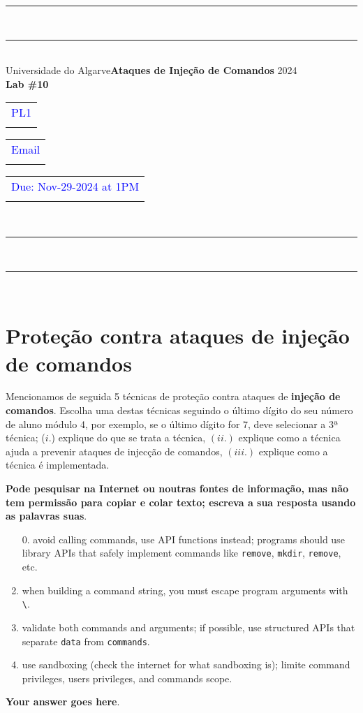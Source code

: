 \documentclass{article}
\begin{document}
\begin{center}
\rule{\textwidth}{.0075in} \\
\rule[3mm]{\textwidth}{.0075in}\\

Universidade do Algarve\hfill \textbf{Ataques de Injeção de Comandos} \hfill 2024\\[3ex]

{\Large\bf Lab \#10} \\[3ex]

\begin{tabular}{l}
\textcolor{blue}{PL1} \\ \hfill 
\end{tabular}
\begin{tabular}{l}
\textcolor{blue}{Email} \\ \hfill 
\end{tabular}
\begin{tabular}{l}
\textcolor{blue}{Due: Nov-29-2024 at 1PM} \\ \hfill 
\end{tabular}\\

\rule{\textwidth}{.0075in} \\
\rule[3mm]{\textwidth}{.0075in} \\
\end{center}

\section*{Proteção contra ataques de injeção de comandos}

Mencionamos de seguida 5 técnicas de proteção contra ataques de
\textbf{injeção de comandos}. Escolha uma destas técnicas seguindo o
último dígito do seu número de aluno módulo 4, por exemplo, se o
último dígito for 7, deve selecionar a 3ª técnica; ($i.$) explique do
que se trata a técnica, $(ii.)$ explique como a técnica ajuda a
prevenir ataques de injecção de comandos, $(iii.)$ explique como a
técnica é implementada.

\bigskip

{\large
  \noindent
\textbf{Pode pesquisar na Internet ou noutras fontes de informação, mas não
tem permissão para copiar e colar texto; escreva a sua resposta usando
as palavras suas}.
}

\bigskip

\begin{enumerate}
\item[0.] avoid calling commands, use API functions instead; programs
  should use library APIs that safely implement commands like
  \texttt{remove}, \texttt{mkdir}, \texttt{remove}, etc.
\item when building a command string, you must escape program
  arguments with \verb|\|.
\item validate both commands and arguments; if possible, use
  structured APIs that separate \texttt{data} from \texttt{commands}.
\item use sandboxing (check the internet for what sandboxing is); limite command
  privileges, users privileges, and commands scope.
\end{enumerate}

\bigskip 
\bigskip

\textbf{Your answer goes here}.
\end{document}
